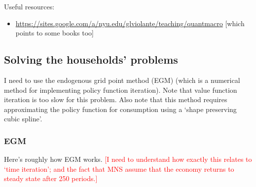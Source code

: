 \documentclass[12pt]{article}
\begin{document}
Useful resources:
\begin{itemize}
\item \url{https://sites.google.com/a/nyu.edu/glviolante/teaching/quantmacro} [which points to some books too]
\end{itemize}

\subsection{Solving the households' problems}
I need to use the endogenous grid point method (EGM) (which is a numerical method for implementing policy function iteration). Note that value function iteration is too slow for this problem. Also note that this method requires approximating the policy function for consumption using a `shape preserving cubic spline'.

\subsubsection{EGM}
Here's roughly how EGM works. \textcolor{red}{[I need to understand how exactly this relates to `time iteration'; and the fact that MNS assume that the economy returns to steady state after 250 periods.]} \\
\end{document}
